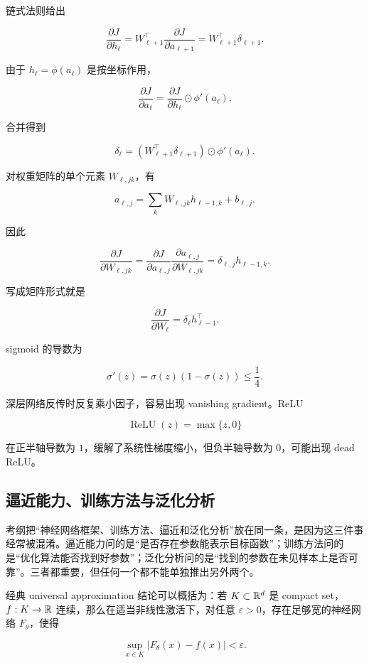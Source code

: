 \documentclass[11pt]{ctexart}
\begin{document}
链式法则给出

\[
  \frac{\partial J}{\partial h_\ell}
  =
  W_{\ell+1}^\top
  \frac{\partial J}{\partial a_{\ell+1}}
  =
  W_{\ell+1}^\top\delta_{\ell+1}.
\]

由于 \(h_\ell=\phi(a_\ell)\) 是按坐标作用，

\[
  \frac{\partial J}{\partial a_\ell}
  =
  \frac{\partial J}{\partial h_\ell}
  \odot
  \phi'(a_\ell).
\]

合并得到

\[
  \delta_\ell
  =
  (W_{\ell+1}^\top\delta_{\ell+1})
  \odot
  \phi'(a_\ell).
\]

对权重矩阵的单个元素 \(W_{\ell,jk}\)，有

\[
  a_{\ell,j}
  =
  \sum_k W_{\ell,jk}h_{\ell-1,k}+b_{\ell,j}.
\]

因此

\[
  \frac{\partial J}{\partial W_{\ell,jk}}
  =
  \frac{\partial J}{\partial a_{\ell,j}}
  \frac{\partial a_{\ell,j}}{\partial W_{\ell,jk}}
  =
  \delta_{\ell,j}h_{\ell-1,k}.
\]

写成矩阵形式就是

\[
  \frac{\partial J}{\partial W_\ell}
  =
  \delta_\ell h_{\ell-1}^\top.
\]

sigmoid 的导数为

\[
  \sigma'(z)=\sigma(z)(1-\sigma(z))\le\frac14.
\]

深层网络反传时反复乘小因子，容易出现 vanishing gradient。ReLU

\[
  \operatorname{ReLU}(z)=\max\{z,0\}
\]

在正半轴导数为 \(1\)，缓解了系统性梯度缩小，但负半轴导数为 \(0\)，可能出现 dead ReLU。

\subsection{逼近能力、训练方法与泛化分析}

考纲把“神经网络框架、训练方法、逼近和泛化分析”放在同一条，是因为这三件事经常被混淆。逼近能力问的是“是否存在参数能表示目标函数”；训练方法问的是“优化算法能否找到好参数”；泛化分析问的是“找到的参数在未见样本上是否可靠”。三者都重要，但任何一个都不能单独推出另外两个。

经典 universal approximation 结论可以概括为：若 \(K\subset\mathbb{R}^d\) 是 compact set，\(f:K\to\mathbb{R}\) 连续，那么在适当非线性激活下，对任意 \(\varepsilon>0\)，存在足够宽的神经网络 \(F_\theta\)，使得

\[
  \sup_{x\in K}|F_\theta(x)-f(x)|<\varepsilon.
\]
\end{document}
